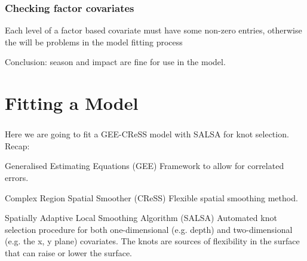 \begin{frame}[fragile]
\frametitle{Checking factor covariates}
Each level of a factor based covariate must have some non-zero entries, otherwise the will be problems in the model fitting process 
\begin{knitrout}\footnotesize
{}\color{fgcolor}
\end{knitrout}
\begin{block}{}
Conclusion: season and impact are fine for use in the model.
\end{block}
\end{frame}
\section{Fitting a Model}

\begin{frame}[fragile]
\frametitle{}
Here we are going to fit a GEE-CReSS model with SALSA for knot selection. Recap:
\begin{block}{Generalised Estimating Equations (GEE)}
Framework to allow for correlated errors.
\end{block}

\begin{block}{Complex Region Spatial Smoother (CReSS)}
Flexible spatial smoothing method.
\end{block}

\begin{block}{Spatially Adaptive Local Smoothing Algorithm (SALSA)}
Automated knot selection procedure for both one-dimensional (e.g. depth) and two-dimensional (e.g. the x, y plane) covariates.  The knots are sources of flexibility in the surface that can raise or lower the surface.
\end{block}
\end{frame}


